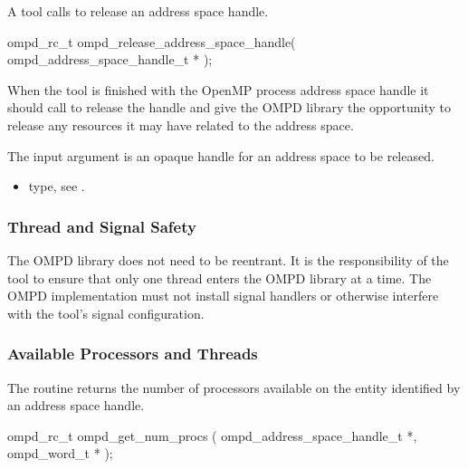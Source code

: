 \label{subsubsubsec:ompd_release_address_space_handle}
\summary
A tool calls  to release an address space 
handle.

\format

\begin{cspecific}
\begin{ompSyntax}
ompd_rc_t ompd_release_address_space_handle(
  ompd_address_space_handle_t *
);
\end{ompSyntax}
\end{cspecific}


\descr
When the tool is finished with the OpenMP process address space handle it
should call  to release
the handle and give the OMPD library the opportunity to release
any resources it may have related to the address space.

\argdesc
The input argument  is an opaque handle for an address space
to be released.

\crossreferences	
\begin{itemize}
	\item {} type, see 
	.
\end{itemize}

\subsubsection{Thread and Signal Safety}

The OMPD library does not need to be reentrant. It is the responsibility 
of the tool to ensure that only one thread enters the OMPD library at a time. The OMPD 
implementation must not install signal handlers or otherwise interfere with the tool's signal 
configuration.


\subsubsection{Available Processors and Threads}

\label{subsubsubsec:ompd_get_num_procs}
\summary
The  routine returns the number of processors
available on the entity identified by an address space handle.

\format

\begin{cspecific}
\begin{ompSyntax}
ompd_rc_t ompd_get_num_procs (
  ompd_address_space_handle_t *,
  ompd_word_t *
);
\end{ompSyntax}
\end{cspecific}


